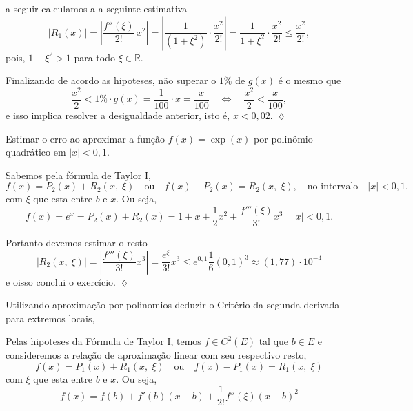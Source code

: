 a seguir calculamos a a seguinte estimativa 
\begin{equation*}
\left|R_{1}(x)\right|=\left|\dfrac{f''(\xi)}{2!}\,x^{2}\right|=\left|\dfrac{1}{(1+\xi^{2})}\cdot 
\dfrac{x^{2}}{2!}\right| =\dfrac{1}{1+\xi^{2}}\cdot 
\dfrac{x^{2}}{2!} \leq \dfrac{x^{2}}{2!},
\end{equation*}
pois, \(1+\xi^{2}>1\) para todo \(\xi \in \mathbb{R}\).

Finalizando de acordo as hipoteses, não superar o \(1\%\) de \(g(x)\) é o mesmo que
\begin{equation*}
  \dfrac{x^{2}}{2} < 1\%\cdot g(x)=\dfrac{1}{100}\cdot x=\dfrac{x}{100}\quad \Leftrightarrow \quad
  \dfrac{x^{2}}{2} < \dfrac{x}{100},
\end{equation*}
e isso implica resolver a desigualdade anterior, isto é, \(x < 0,02\). \hfill \(\lozenge\)

\begin{exer}
Estimar o erro ao aproximar a função \(f(x)=\exp(x)\) por polinômio quadrático em \(|x|<0,1\).
\end{exer}

\solo
Sabemos pela fórmula de Taylor I,
\begin{equation*}
f(x)=P_{2}(x)+R_{2}(x,\; \xi)\quad \text{ou}\quad f(x)-P_{2}(x)=R_{2}(x,\; \xi), \quad 
\text{no intervalo} \quad |x| <0,1.
\end{equation*}
com \(\xi\) que esta entre \(b\) e \(x\). Ou seja,
\begin{equation*}
f(x)=e^{x}=P_{2}(x)+R_{2}(x)=1+x+\dfrac{1}{2}x^{2}+\dfrac{f'''(\xi)}{3!}x^{3}\quad |x|< 0,1.
\end{equation*}

Portanto devemos estimar o resto 
\begin{equation*}
\left|R_{2}(x,\;\xi)\right| =\left|\dfrac{f'''(\xi)}{3!}x^{3}\right|=
\dfrac{e^{\xi}}{3!}x^{3} \leq e^{0,1}\dfrac{1}{6}(0,1)^{3}\approx (1,77)\cdot 10^{-4}
\end{equation*}
e oisso conclui o exercício. \hfill \(\lozenge\)


\begin{exer}
Utilizando aproximação por polinomios deduzir o Critério da segunda derivada para extremos locais,
\end{exer}

\solo
Pelas hipoteses da Fórmula de Taylor I, temos \(f \in C^{2}(E)\) tal que \(b \in E\) e consideremos 
a relação de aproximação linear com seu respectivo resto,
\begin{equation}\label{eq:aprox-taylor}
f(x)=P_{1}(x)+R_{1}(x,\; \xi)\quad \text{ou}\quad f(x)-P_{1}(x)=R_{1}(x,\; \xi)
\end{equation}
com \(\xi\) que esta entre \(b\) e \(x\). Ou seja,
\begin{equation*}
  f(x)=f(b)+f'(b)(x-b)+\dfrac{1}{2!}f''(\xi)(x-b)^{2}
\end{equation*}

